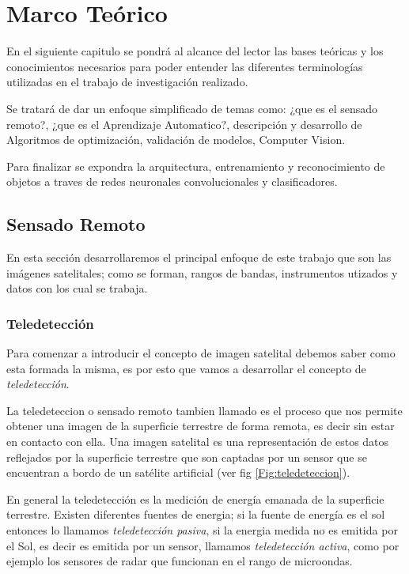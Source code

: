 \chapter{Marco Teórico} \label{chap:marcoteorico}

En el siguiente capitulo se pondrá al alcance del lector las bases teóricas y los conocimientos necesarios para poder entender las diferentes terminologías utilizadas en el trabajo de investigación realizado.

Se tratará de dar un enfoque simplificado de temas como: ¿que es el sensado remoto?, ¿que es el Aprendizaje Automatico?, descripción y desarrollo de Algoritmos de optimización, validación de modelos, Computer Vision.

Para finalizar se expondra la arquitectura, entrenamiento y reconocimiento de objetos a traves de  redes neuronales convolucionales y clasificadores.

\section{Sensado Remoto}\label{sec:sensadoremoto}

En esta sección desarrollaremos el principal enfoque de este trabajo que son las imágenes satelitales; como se forman, rangos de bandas, instrumentos utizados y datos con los cual se trabaja.

\subsection{Teledetección}\label{sub:teledeteccion}

Para comenzar a introducir el concepto de imagen satelital debemos saber como esta formada la misma, es por esto que vamos a desarrollar el concepto de \textit{teledetección}.

La teledeteccion o sensado remoto tambien llamado es el proceso que nos permite obtener una imagen de la superficie terrestre de forma remota, es decir sin estar en contacto con ella. Una imagen satelital es una representación de estos datos reflejados por la superficie terrestre que son captadas por un sensor que se encuentran a bordo de un satélite artificial (ver fig \ref{Fig:teledeteccion}).

En general la teledetección es la medición de energía emanada de la superficie terrestre. Existen diferentes fuentes de energia; si la fuente de energía es el sol entonces lo llamamos \textit{teledetección pasiva}, si la energia medida no es emitida por el Sol, es decir es emitida por un sensor, llamamos \textit{teledetección activa}, como por ejemplo los sensores de radar que funcionan en el rango de microondas.


